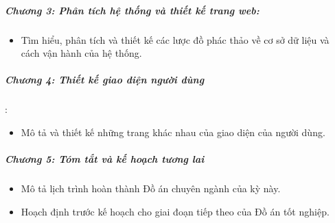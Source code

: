 \subparagraph{Chương 3: Phân tích hệ thống và thiết kế trang web:}
\begin{itemize}
    \item Tìm hiểu, phân tích và thiết kế các lược đồ phác thảo về cơ sở dữ liệu và cách vận hành của hệ thống.
\end{itemize}

 \subparagraph{Chương 4: Thiết kế giao diện người dùng}:
 \begin{itemize}
     \item Mô tả và thiết kế những trang khác nhau của giao diện của người dùng.
 \end{itemize}
 
 \subparagraph{Chương 5: Tóm tắt và kế hoạch tương lai}
 \begin{itemize}
 	\item Mô tả lịch trình hoàn thành Đồ án chuyên ngành của kỳ này.
 	\item Hoạch định trước kế hoạch cho giai đoạn tiếp theo của Đồ án tốt nghiệp.
 \end{itemize}